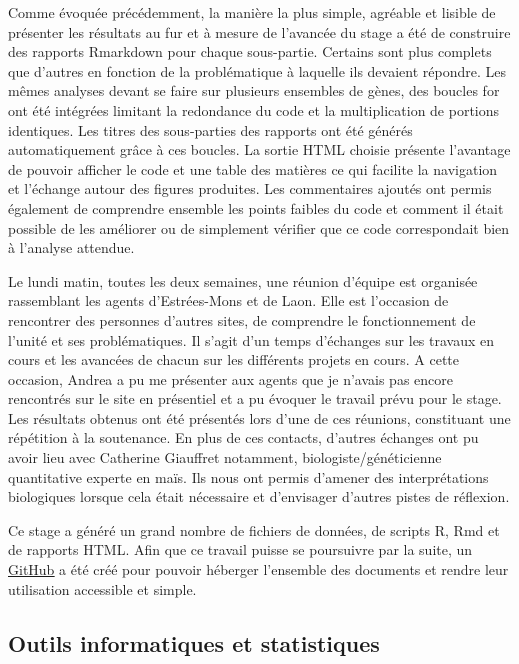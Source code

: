 \documentclass[twoside]{article}
\begin{document}
    \vspace{0.5cm}Comme évoquée précédemment, la manière la plus simple, agréable et lisible de présenter les résultats au fur et à mesure de l'avancée du stage a été de construire des rapports Rmarkdown pour chaque sous-partie. Certains sont plus complets que d'autres en fonction de la problématique à laquelle ils devaient répondre. Les mêmes analyses devant se faire sur plusieurs ensembles de gènes, des boucles for ont été intégrées limitant la redondance du code et la multiplication de portions identiques. Les titres des sous-parties des rapports ont été générés automatiquement grâce à ces boucles. La sortie HTML choisie présente l'avantage de pouvoir afficher le code et une table des matières ce qui facilite la navigation et l'échange autour des figures produites. Les commentaires ajoutés ont permis également de comprendre ensemble les points faibles du code et comment il était possible de les améliorer ou de simplement vérifier que ce code correspondait bien à l'analyse attendue.
    
    \vspace{0.5cm}Le lundi matin, toutes les deux semaines, une réunion d'équipe est organisée rassemblant les agents d'Estrées-Mons et de Laon. Elle est l'occasion de rencontrer des personnes d'autres sites, de comprendre le fonctionnement de l'unité et ses problématiques. Il s'agit d'un temps d'échanges sur les travaux en cours et les avancées de chacun sur les différents projets en cours. A cette occasion, Andrea a pu me présenter aux agents que je n'avais pas encore rencontrés sur le site en présentiel et a pu évoquer le travail prévu pour le stage. Les résultats obtenus ont été présentés lors d'une de ces réunions, constituant une répétition à la soutenance. En plus de ces contacts, d'autres échanges ont pu avoir lieu avec Catherine Giauffret notamment, biologiste/généticienne quantitative experte en maïs. Ils nous ont permis d'amener des interprétations biologiques lorsque cela était nécessaire et d'envisager d'autres pistes de réflexion.
    
    \newpage
    \vspace{0.5cm}Ce stage a généré un grand nombre de fichiers de données, de scripts R, Rmd et de rapports HTML. Afin que ce travail puisse se poursuivre par la suite, un \href{https://github.com/SolenePety/COOLKIT.git}{\underline{GitHub}} a été créé pour pouvoir héberger l'ensemble des documents et rendre leur utilisation accessible et simple.
    
    \subsection{Outils informatiques et statistiques}
    
\end{document}
